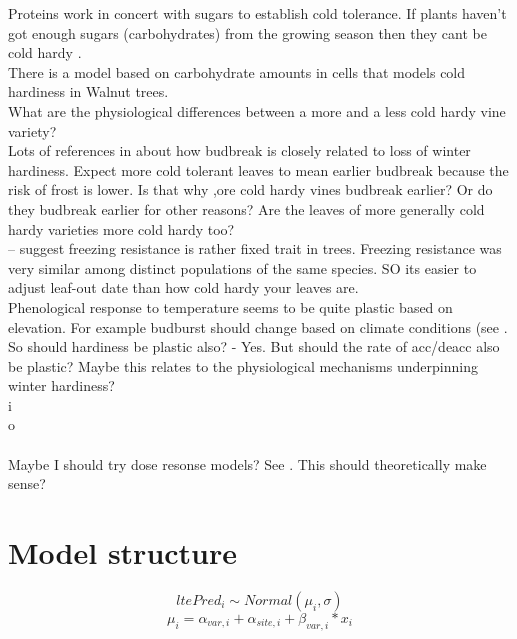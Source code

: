 \documentclass[11pt,letter]{article}
\begin{document}
Proteins work in concert with sugars to establish cold tolerance. If plants haven't got enough sugars (carbohydrates) from the growing season then they cant be cold hardy \citep{Gusta2013}. \\

There is a model based on carbohydrate amounts in cells that models cold hardiness in Walnut trees. \\ 

What are the physiological differences between a more and a less cold hardy vine variety? \\

Lots of references in \cite{Lenz2016} about how budbreak is closely related to loss of winter hardiness. Expect more cold tolerant leaves to mean earlier budbreak because the risk of frost is lower. Is that why ,ore cold hardy vines budbreak earlier? Or do they budbreak earlier for other reasons? Are the leaves of more generally cold hardy varieties more cold hardy too? \\
  
\cite{Lenz2016} – suggest freezing resistance is rather fixed trait in trees. Freezing resistance was very similar among distinct populations of the same species. SO its easier to adjust leaf-out date than how cold hardy your leaves are. \\

Phenological response to temperature seems to be quite plastic based on elevation. For example budburst should change based on climate conditions (see \citep{Caffarra2010}. So should hardiness be plastic also? - Yes. But should the rate of acc/deacc also be plastic? Maybe this relates to the physiological mechanisms underpinning winter hardiness? \\

i\\
o\\
\\

Maybe I should try dose resonse models? See \cite{Ritz2015}. This should theoretically make sense? 

\section{Model structure}

\begin{equation*}
ltePred_{i} \sim Normal(\mu_{i}, \sigma ) 
\end{equation*}
\begin{equation*}
\mu_{i} = \alpha_{var,i} + \alpha_{site, i}+ \beta_{var, i}\ast x_{i}
\end{equation*}
\end{document}
